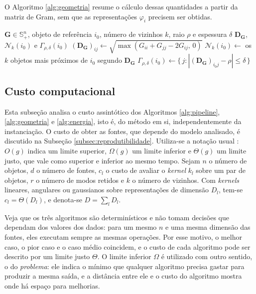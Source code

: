 O Algoritmo \ref{alg:geometria} resume o cálculo dessas quantidades a partir da matriz de Gram, sem que as representações $\varphi_i$ precisem ser obtidas.

\begin{algorithm}[htbp]
\caption{Geometria relativa induzida pela matriz de Gram}
\label{alg:geometria}
\begin{algorithmic}[1]
\Require $\mathbf{G} \in \mathbb{S}_+^n$, objeto de referência $i_0$, número de vizinhos $k$, raio $\rho$ e espessura $\delta$
\Ensure $\mathbf{D}_{\mathbf{G}}$, $\mathcal{N}_k(i_0)$ e $\Gamma_{\rho,\delta}(i_0)$
    \State $(\mathbf{D}_{\mathbf{G}})_{ij} \gets \sqrt{\max\left(G_{ii} + G_{jj} - 2G_{ij},\, 0\right)}$ 
\EndFor
\State $\mathcal{N}_k(i_0) \gets$ os $k$ objetos mais próximos de $i_0$ segundo $\mathbf{D}_{\mathbf{G}}$
\State $\Gamma_{\rho,\delta}(i_0) \gets \{\, j : |(\mathbf{D}_{\mathbf{G}})_{i_0 j} - \rho| \leq \delta \,\}$
\end{algorithmic}
\end{algorithm}
\subsection{Custo computacional}\label{subsec:custo}

Esta subseção analisa o custo assintótico dos Algoritmos \ref{alg:pipeline}, \ref{alg:geometria} e \ref{alg:energia}, isto é, do método em si, independentemente da instanciação. O custo de obter as fontes, que depende do modelo analisado, é discutido na Subseção \ref{subsec:reprodutibilidade}. Utiliza-se a notação usual \citep{Cormen2009}: $O(g)$ indica um limite superior, $\Omega(g)$ um limite inferior e $\Theta(g)$ um limite justo, que vale como superior e inferior ao mesmo tempo. Sejam $n$ o número de objetos, $d$ o número de fontes, $c_l$ o custo de avaliar o \textit{kernel} $k_l$ sobre um par de objetos, $r$ o número de modos retidos e $k$ o número de vizinhos. Com \textit{kernels} lineares, angulares ou gaussianos sobre representações de dimensão $D_l$, tem-se $c_l = \Theta(D_l)$, e denota-se $D = \sum_l D_l$.

Veja que os três algoritmos são determinísticos e não tomam decisões que dependam dos valores dos dados: para um mesmo $n$ e uma mesma dimensão das fontes, eles executam sempre as mesmas operações. Por esse motivo, o melhor caso, o pior caso e o caso médio coincidem, e o custo de cada algoritmo pode ser descrito por um limite justo $\Theta$. O limite inferior $\Omega$ é utilizado com outro sentido, o do \textit{problema}: ele indica o mínimo que qualquer algoritmo precisa gastar para produzir a mesma saída, e a distância entre ele e o custo do algoritmo mostra onde há espaço para melhorias.

